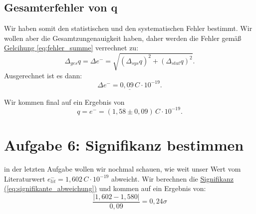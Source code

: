 \subsection*{Gesamterfehler von q}
Wir haben somit den statistischen und den systematischen Fehler bestimmt. Wir wollen aber die Gesamtzungenauigkeit haben, daher werden die Fehler gemäß \hyperref[eq:fehler_summe]{Gelcihung \ref*{eq:fehler_summe}} verrechnet zu:
\begin{equation}
    \Delta_{ges} q = \Delta e^- = \sqrt{(\Delta_{sys} q)^2 + (\Delta_{stat} q)^2}.
\end{equation}
Ausgerechnet ist es dann:
\begin{equation}
    \underline{\Delta e^- = 0,09 \, C \cdot 10^{-19}.}
\end{equation}

Wir kommen final auf ein Ergebnis von 
\begin{equation}
    \boxed{q = e^- = (1,58 \pm 0,09) \, C \cdot 10^{-19}}.
\end{equation}

\section{Aufgabe 6: Signifikanz bestimmen}
in der letzten Aufgabe wollen wir nochmal schauen, wie weit unser Wert vom Literaturwert $e^-_{lit} = 1,602 \, C \cdot 10^{-19}$ abweicht. Wir berechnen die \hyperref[eq:signifikante_abweichung]{Signifikanz (\ref*{eq:signifikante_abweichung})} und kommen auf ein Ergebnis von:
\begin{equation}
    \boxed{\frac{\left| 1,602 - 1,580 \right|}{0,09} = 0,24\sigma}
\end{equation}

